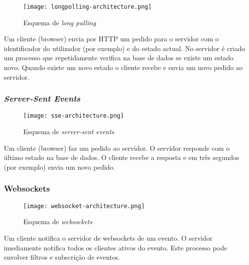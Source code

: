 \begin{figure}[H]
\centering
\texttt{[image: longpolling-architecture.png]}
\caption{Esquema de \textit{long pulling}}
\label{fig:long_pulling}
\end{figure}

Um cliente (browser) envia por HTTP um pedido para o servidor com o identificador do utilizador (por exemplo) e do estado actual. No servidor é criado um processo que repetidamente verifica na base de dados se existe um estado novo. Quando existe um novo estado o cliente recebe e envia um novo pedido ao servidor.

\subsubsection{\textit{Server-Sent Events}}

\begin{figure}[H]
\centering
\texttt{[image: sse-architecture.png]}
\caption{Esquema de \textit{server-sent events}}
\label{fig:sse-architecture}
\end{figure}

Um cliente (browser) faz um pedido ao servidor. O servidor responde com o último estado na base de dados. O cliente recebe a resposta e em três segundos (por exemplo) envia um novo pedido.

\subsubsection{Websockets}

\begin{figure}[H]
\centering
\texttt{[image: websocket-architecture.png]}
\caption{Esquema de \textit{websockets}}
\label{fig:websockets-architecture}
\end{figure}

Um cliente notifica o servidor de websockets de um evento. O servidor imediamente notifica todos os clientes ativos do evento. Este processo pode envolver filtros e subscrição de eventos.



